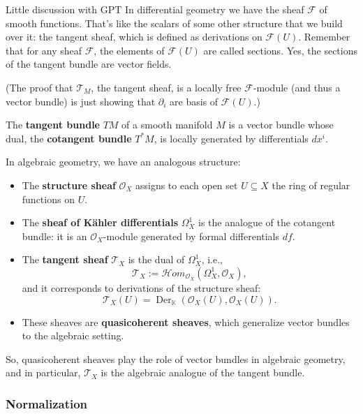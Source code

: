 \begin{thing6}{Little discussion with GPT}\leavevmode
In differential geometry we have the sheaf \(\mathcal{F}\) of smooth functions. That's like the scalars of some other structure that we build over it: the tangent sheaf, which is defined as derivations on \(\mathcal{F}(U)\). Remember that for any sheaf \(\mathcal{F}\), the elements of \(\mathcal{F}(U)\) are called sections. Yes, the sections of the tangent bundle are vector fields.

(The proof that \(\mathcal{T}_M\), the tangent sheaf, is a locally free \(\mathcal{F}\)-module (and thus a vector bundle) is just showing that \(\partial_i\) are basis of \(\mathcal{F}(U)\).)

The \textbf{tangent bundle} $TM$ of a smooth manifold $M$ is a vector bundle whose dual, the \textbf{cotangent bundle} $T^*M$, is locally generated by differentials $dx^i$.

	In algebraic geometry, we have an analogous structure:

\begin{itemize}
  \item The \textbf{structure sheaf} $\mathcal{O}_X$ assigns to each open set $U \subseteq X$ the ring of regular functions on $U$.
  \item The \textbf{sheaf of Kähler differentials} $\Omega^1_X$ is the analogue of the cotangent bundle: it is an $\mathcal{O}_X$-module generated by formal differentials $df$.
  \item The \textbf{tangent sheaf} $\mathcal{T}_X$ is the dual of $\Omega^1_X$, i.e.,
  \[
  \mathcal{T}_X := \mathcal{H}om_{\mathcal{O}_X}(\Omega^1_X, \mathcal{O}_X),
  \]
  and it corresponds to derivations of the structure sheaf:
  \[
  \mathcal{T}_X(U) = \operatorname{Der}_{\mathbb{K}}(\mathcal{O}_X(U), \mathcal{O}_X(U)).
  \]
  \item These sheaves are \textbf{quasicoherent sheaves}, which generalize vector bundles to the algebraic setting.
\end{itemize}

So, quasicoherent sheaves play the role of vector bundles in algebraic geometry, and in particular, $\mathcal{T}_X$ is the algebraic analogue of the tangent bundle.
\end{thing6}

\subsubsection{Normalization}

